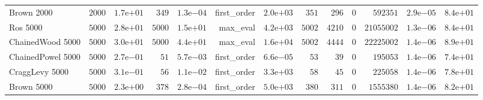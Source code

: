 \begin{longtable}[c]{lrrrrrrrrrrrr}
Brown 2000 & \( 2000\) & \( 1.7\)e\(+01\) & \(  349\) & \( 1.3\)e\(-04\) & first\_order & \( 2.0\)e\(+03\) & \(  351\) & \(  296\) & \(    0\) & \(592351\) & \( 2.9\)e\(-05\) & \( 8.4\)e\(+01\) \\
Ros 5000 & \( 5000\) & \( 2.8\)e\(+01\) & \( 5000\) & \( 1.5\)e\(+01\) & max\_eval & \( 4.2\)e\(+03\) & \( 5002\) & \( 4210\) & \(    0\) & \(21055002\) & \( 1.3\)e\(-06\) & \( 8.4\)e\(+01\) \\
ChainedWood 5000 & \( 5000\) & \( 3.0\)e\(+01\) & \( 5000\) & \( 4.4\)e\(+01\) & max\_eval & \( 1.6\)e\(+04\) & \( 5002\) & \( 4444\) & \(    0\) & \(22225002\) & \( 1.4\)e\(-06\) & \( 8.9\)e\(+01\) \\
ChainedPowel 5000 & \( 5000\) & \( 2.7\)e\(-01\) & \(   51\) & \( 5.7\)e\(-03\) & first\_order & \( 6.6\)e\(-05\) & \(   53\) & \(   39\) & \(    0\) & \(195053\) & \( 1.4\)e\(-06\) & \( 7.4\)e\(+01\) \\
CraggLevy 5000 & \( 5000\) & \( 3.1\)e\(-01\) & \(   56\) & \( 1.1\)e\(-02\) & first\_order & \( 3.3\)e\(+03\) & \(   58\) & \(   45\) & \(    0\) & \(225058\) & \( 1.4\)e\(-06\) & \( 7.8\)e\(+01\) \\
Brown 5000 & \( 5000\) & \( 2.3\)e\(+00\) & \(  378\) & \( 2.8\)e\(-04\) & first\_order & \( 5.0\)e\(+03\) & \(  380\) & \(  311\) & \(    0\) & \(1555380\) & \( 1.4\)e\(-06\) & \( 8.2\)e\(+01\) \\
\hline 
\end{longtable}



